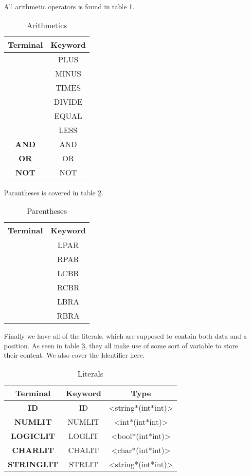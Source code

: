 \documentclass[10pt]{article}
\begin{document}
All arithmetic operators is found in table \ref{tab:arithmetics}.

\begin{table}[h!]
\centering
\begin{tabular}{c|c}
Terminal & Keyword \\
\hline
\text{+} & PLUS \\
\text{-} & MINUS \\
\text{*} & TIMES \\
\text{/} & DIVIDE \\
\text{=} & EQUAL \\
\text{<} & LESS \\
\textbf{AND} & AND \\
\textbf{OR} & OR \\
\textbf{NOT} & NOT \\
\end{tabular}
\caption{\label{tab:arithmetics}Arithmetics}
\end{table}

Parantheses is covered in table \ref{tab:parentheses}.

\begin{table}[h!]
\centering
\begin{tabular}{c|c}
Terminal & Keyword \\
\hline
\text{(} & LPAR \\
\text{)} & RPAR \\
\text{\{} & LCBR \\
\text{\}} & RCBR \\
\text{[} & LBRA \\
\text{]} & RBRA \\
\end{tabular}
\caption{\label{tab:parentheses}Parentheses}
\end{table}

Finally we have all of the literals, which are supposed to contain both data and a position. As seen in table \ref{tab:literals}, they all make use of some sort of variable to store their content. We also cover the Identifier here.

\begin{table}[!h]
\centering
\begin{tabular}{c|cc}
Terminal & Keyword & Type\\
\hline
\textbf{ID} & ID & <string*(int*int)>\\
\textbf{NUMLIT} & NUMLIT & <int*(int*int)>\\
\textbf{LOGICLIT} & LOGLIT & <bool*(int*int)> \\
\textbf{CHARLIT} & CHALIT & <char*(int*int)> \\
\textbf{STRINGLIT} & STRLIT & <string*(int*int)> \\
\end{tabular}
\caption{\label{tab:literals}Literals}
\end{table}
\end{document}
